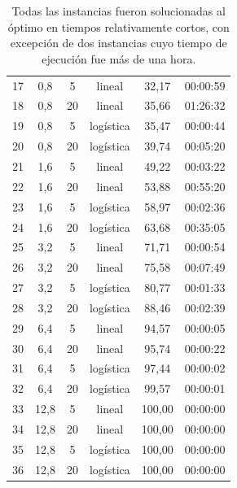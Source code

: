 \documentclass{article}
\begin{document}
\begin{table}
\begin{tabular}{cccccc}
        17 & 0,8 & 5 & lineal & 32,17 & 00:00:59 \\
        18 & 0,8 & 20 & lineal & 35,66 & 01:26:32 \\
        19 & 0,8 & 5 & logística & 35,47 & 00:00:44 \\
        20 & 0,8 & 20 & logística & 39,74 & 00:05:20 \\
        21 & 1,6 & 5 & lineal & 49,22 & 00:03:22 \\
        22 & 1,6 & 20 & lineal & 53,88 & 00:55:20 \\
        23 & 1,6 & 5 & logística & 58,97 & 00:02:36 \\
        24 & 1,6 & 20 & logística & 63,68 & 00:35:05 \\
        25 & 3,2 & 5 & lineal & 71,71 & 00:00:54 \\
        26 & 3,2 & 20 & lineal & 75,58 & 00:07:49 \\
        27 & 3,2 & 5 & logística & 80,77 & 00:01:33 \\
        28 & 3,2 & 20 & logística & 88,46 & 00:02:39 \\
        29 & 6,4 & 5 & lineal & 94,57 & 00:00:05 \\
        30 & 6,4 & 20 & lineal & 95,74 & 00:00:22 \\
        31 & 6,4 & 5 & logística & 97,44 & 00:00:02 \\
        32 & 6,4 & 20 & logística & 99,57 & 00:00:01 \\
        33 & 12,8 & 5 & lineal & 100,00 & 00:00:00 \\
        34 & 12,8 & 20 & lineal & 100,00 & 00:00:00 \\
        35 & 12,8 & 5 & logística & 100,00 & 00:00:00 \\
        36 & 12,8 & 20 & logística & 100,00 & 00:00:00 \\
        \bottomrule
    \end{tabular}
    \caption{Todas las instancias fueron solucionadas al óptimo en tiempos relativamente cortos, con excepción de dos instancias cuyo tiempo de ejecución fue más de una hora.} \label{table:sensibilityresults}
  \end{table}
\end{document}
